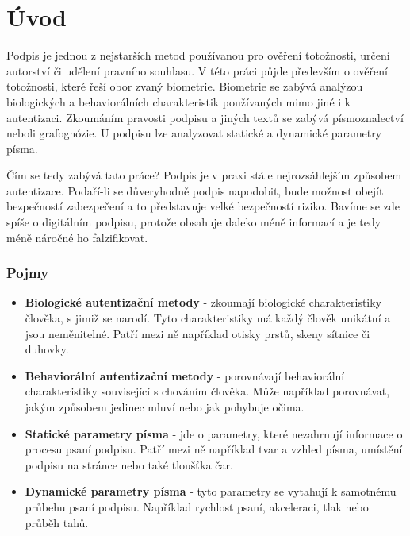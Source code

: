 
%

\chapter{Úvod}
Podpis je jednou z nejstarších metod používanou pro ověření totožnosti, určení autorství či udělení pravního souhlasu. V této práci půjde především o ověření totožnosti, které řeší obor zvaný biometrie. Biometrie se zabývá analýzou biologických a behaviorálních charakteristik používaných mimo jiné i k autentizaci. 
Zkoumáním pravosti podpisu a jiných textů se zabývá písmoznalectví neboli grafognózie. U podpisu lze analyzovat statické a dynamické parametry písma. 

Čím se tedy zabývá tato práce? Podpis je v praxi stále nejrozsáhlejším způsobem autentizace. Podaří-li se důveryhodně podpis napodobit, bude možnost obejít bezpečností zabezpečení a to představuje velké bezpečností riziko. 
Bavíme se zde spíše o digitálním podpisu, protože obsahuje daleko méně informací a je tedy méně náročné ho falzifikovat.


\subsection{Pojmy}
\begin{itemize}
  \item{\textbf{Biologické autentizační metody} - zkoumají biologické charakteristiky člověka, s jimiž se narodí. Tyto charakteristiky má každý člověk unikátní a jsou neměnitelné. Patří mezi ně například otisky prstů, skeny sítnice či duhovky.}  
  \item{\textbf{Behaviorální autentizační metody} - porovnávají behaviorální charakteristiky související s chováním člověka. Může například porovnávat, jakým způsobem jedinec mluví nebo jak pohybuje očima.}
  \item{\textbf{Statické parametry písma} - jde o parametry, které nezahrnují informace o procesu psaní podpisu. Patří mezi ně například tvar a vzhled písma, umístění podpisu na stránce nebo také tloušťka čar.}
  \item{\textbf{Dynamické parametry písma} - tyto parametry se vytahují k samotnému průbehu psaní podpisu. Například rychlost psaní, akceleraci, tlak nebo průběh tahů.}
\end{itemize}
